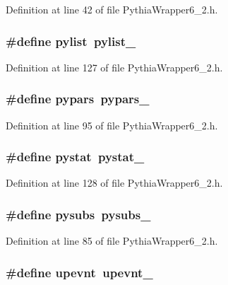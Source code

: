 Definition at line 42 of file Pythia\-Wrapper6\_\-2.h.
\subsubsection{\setlength{\rightskip}{0pt plus 5cm}\#define pylist~pylist\_\-}\label{PythiaWrapper6__2_8h_1dbe019361406129606ebb26aae757b9}




Definition at line 127 of file Pythia\-Wrapper6\_\-2.h.
\subsubsection{\setlength{\rightskip}{0pt plus 5cm}\#define pypars~{\bf pypars\_\-}}\label{PythiaWrapper6__2_8h_8da7c9220b540db4b5ab2b9dce72eb8c}




Definition at line 95 of file Pythia\-Wrapper6\_\-2.h.
\subsubsection{\setlength{\rightskip}{0pt plus 5cm}\#define pystat~pystat\_\-}\label{PythiaWrapper6__2_8h_1237254f076fc7dfb0519e6b4d5b0f3e}




Definition at line 128 of file Pythia\-Wrapper6\_\-2.h.
\subsubsection{\setlength{\rightskip}{0pt plus 5cm}\#define pysubs~{\bf pysubs\_\-}}\label{PythiaWrapper6__2_8h_c68bb5af2fc4dac62c64cc8cb6e9f767}




Definition at line 85 of file Pythia\-Wrapper6\_\-2.h.
\subsubsection{\setlength{\rightskip}{0pt plus 5cm}\#define upevnt~upevnt\_\-}\label{PythiaWrapper6__2_8h_7bbeb395b635f3de6c67b0bffe06379c}




